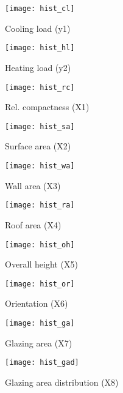 \begin{figure}[h!]
    \centering
    \begin{minipage}{0.45\textwidth}
      \centering
      \texttt{[image: hist\_cl]}
      \caption{Cooling load (y1)}
      \label{fig:hist_cl}
    \end{minipage}\hfill
    \begin{minipage}{0.45\textwidth}
      \centering
      \texttt{[image: hist\_hl]}
      \caption{Heating load (y2)}
      \label{fig:hist_hl}
    \end{minipage}
\end{figure}
\begin{figure}[h!]
    \centering
    \begin{minipage}{0.45\textwidth}
      \centering
      \texttt{[image: hist\_rc]}
      \caption{Rel. compactness (X1)}
      \label{fig:hist_rc}
    \end{minipage}\hfill
    \begin{minipage}{0.45\textwidth}
      \centering
      \texttt{[image: hist\_sa]}
      \caption{Surface area (X2)}
      \label{fig:hist_sa}
    \end{minipage}
\end{figure}
\begin{figure}[h!]
    \centering
    \begin{minipage}{0.45\textwidth}
      \centering
      \texttt{[image: hist\_wa]}
      \caption{Wall area (X3)}
      \label{fig:hist_wa}
    \end{minipage}\hfill
    \begin{minipage}{0.45\textwidth}
      \centering
      \texttt{[image: hist\_ra]}
      \caption{Roof area (X4)}
      \label{fig:hist_ra}
    \end{minipage}
\end{figure}
\begin{figure}[h!]
    \centering
    \begin{minipage}{0.45\textwidth}
      \centering
      \texttt{[image: hist\_oh]}
      \caption{Overall height (X5)}
      \label{fig:hist_oh}
    \end{minipage}\hfill
    \begin{minipage}{0.45\textwidth}
      \centering
      \texttt{[image: hist\_or]}
      \caption{Orientation (X6)}
      \label{fig:hist_or}
    \end{minipage}
\end{figure}
\begin{figure}[h!]
    \centering
    \begin{minipage}{0.45\textwidth}
      \centering
      \texttt{[image: hist\_ga]}
      \caption{Glazing area (X7)}
      \label{fig:hist_ga}
    \end{minipage}\hfill
    \begin{minipage}{0.45\textwidth}
      \centering
      \texttt{[image: hist\_gad]}
      \caption{Glazing area distribution (X8)}
      \label{fig:hist_gad}
    \end{minipage}
\end{figure}
\newpage
